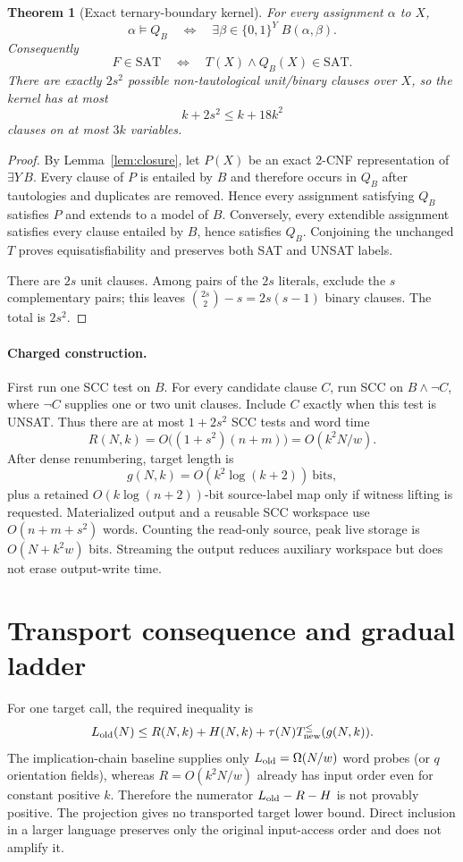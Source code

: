 \documentclass[11pt]{article}
\newtheorem{theorem}{Theorem}
\begin{document}
\begin{theorem}[Exact ternary-boundary kernel]\label{thm:kernel}
For every assignment $\alpha$ to $X$,
\[
 \alpha\models Q_B
 \quad\Longleftrightarrow\quad
 \exists\beta\in\{0,1\}^{Y}\; B(\alpha,\beta).
\]
Consequently
\[
 F\in\mathrm{SAT}\quad\Longleftrightarrow\quad
 T(X)\wedge Q_B(X)\in\mathrm{SAT}.
\]
There are exactly $2s^2$ possible non-tautological unit/binary clauses over
$X$, so the kernel has at most
\[
  k+2s^2\le k+18k^2
\]
clauses on at most $3k$ variables.
\end{theorem}
\begin{proof}
By Lemma~\ref{lem:closure}, let $P(X)$ be an exact 2-CNF representation of
$\exists Y\,B$.  Every clause of $P$ is entailed by $B$ and therefore occurs
in $Q_B$ after tautologies and duplicates are removed.  Hence every assignment
satisfying $Q_B$ satisfies $P$ and extends to a model of $B$.  Conversely,
every extendible assignment satisfies every clause entailed by $B$, hence
satisfies $Q_B$.  Conjoining the unchanged $T$ proves equisatisfiability and
preserves both SAT and UNSAT labels.

There are $2s$ unit clauses.  Among pairs of the $2s$ literals, exclude the
$s$ complementary pairs; this leaves
$\binom{2s}{2}-s=2s(s-1)$ binary clauses.  The total is $2s^2$.
\end{proof}

\paragraph{Charged construction.}
First run one SCC test on $B$.  For every candidate clause $C$, run SCC on
$B\wedge\neg C$, where $\neg C$ supplies one or two unit clauses.  Include
$C$ exactly when this test is UNSAT.  Thus there are at most $1+2s^2$ SCC
tests and word time
\[
 R(N,k)=O\bigl((1+s^2)(n+m)\bigr)=O(k^2N/w).
\]
After dense renumbering, target length is
\[
 g(N,k)=O(k^2\log(k+2))\ \text{bits},
\]
plus a retained $O(k\log(n+2))$-bit source-label map only if witness lifting
is requested.  Materialized output and a reusable SCC workspace use
$O(n+m+s^2)$ words.  Counting the read-only source, peak live storage is
$O(N+k^2w)$ bits.  Streaming the output reduces auxiliary workspace but does
not erase output-write time.

\section{Transport consequence and gradual ladder}
For one target call, the required inequality is
\[
 L_{\rm old}(N)\le R(N,k)+H(N,k)+\tau(N)T_{\rm new}^{\le}(g(N,k)).
\]
The implication-chain baseline supplies only
$L_{\rm old}=\Omega(N/w)$ word probes (or $q$ orientation fields), whereas
$R=O(k^2N/w)$ already has input order even for constant positive $k$.
Therefore the numerator $L_{\rm old}-R-H$ is not provably positive.  The
projection gives no transported target lower bound.  Direct inclusion in a
larger language preserves only the original input-access order and does not
amplify it.
\end{document}
